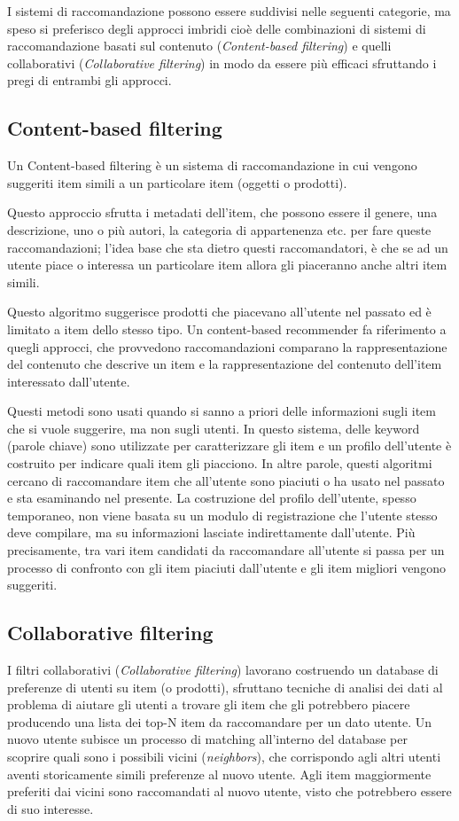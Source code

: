 I sistemi di raccomandazione possono essere suddivisi nelle seguenti categorie, ma speso si preferisco degli approcci imbridi cioè delle
combinazioni di sistemi di raccomandazione basati sul contenuto (\textit{Content-based filtering}) e 
quelli collaborativi (\textit{Collaborative filtering}) in modo da essere più efficaci sfruttando i pregi di entrambi gli approcci.


\subsection{Content-based filtering}
Un Content-based filtering è un sistema di raccomandazione in cui vengono suggeriti item simili a un particolare item (oggetti 
o prodotti). 

Questo approccio sfrutta i metadati dell'item, che possono essere il genere, una descrizione, uno o più autori, la categoria di 
appartenenza etc. per fare queste raccomandazioni; l'idea base che sta dietro questi raccomandatori, è che se ad un utente piace 
o interessa un particolare item allora gli piaceranno anche altri item simili.

Questo algoritmo suggerisce prodotti che piacevano all'utente nel passato ed è limitato a item dello stesso tipo. Un 
content-based recommender fa riferimento a quegli approcci, che provvedono raccomandazioni comparano la rappresentazione del
contenuto che descrive un item e la rappresentazione del contenuto dell'item interessato dall'utente. 

Questi metodi sono usati quando si sanno a priori delle informazioni sugli item che si vuole suggerire, ma non sugli utenti.
In questo sistema, delle keyword (parole chiave) sono utilizzate per caratterizzare gli item e un profilo dell'utente è 
costruito per indicare quali item gli piacciono. In altre parole, questi algoritmi cercano di raccomandare item che 
all'utente sono piaciuti o ha usato nel passato e sta esaminando nel presente. La costruzione del profilo dell'utente,
spesso temporaneo, non viene basata su un modulo di registrazione che l'utente stesso deve compilare, ma su informazioni
lasciate indirettamente dall'utente. Più precisamente, tra vari item candidati da raccomandare all'utente si passa per un 
processo di confronto con gli item piaciuti dall'utente e gli item migliori vengono suggeriti.


\subsection{Collaborative filtering}
I filtri collaborativi (\textit{Collaborative filtering}) lavorano costruendo un database di preferenze di utenti su item (o prodotti),
sfruttano tecniche di analisi dei dati al problema di aiutare gli utenti a trovare gli item che gli potrebbero piacere producendo una 
lista dei top-N item da raccomandare per un dato utente.
Un nuovo utente subisce un processo di matching all'interno del database per scoprire quali sono i possibili vicini (\textit{neighbors}),
che corrispondo agli altri utenti aventi storicamente simili preferenze al nuovo utente. Agli item maggiormente preferiti dai vicini sono
raccomandati al nuovo utente, visto che potrebbero essere di suo interesse. 

